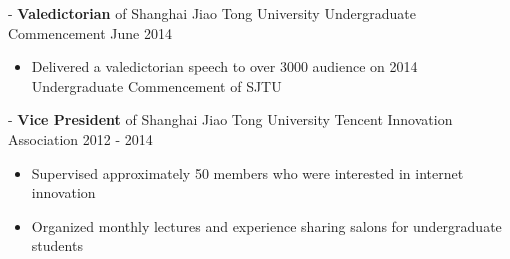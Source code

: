 \documentclass[11pt]{res}
\newcommand{\style}[1]{\color{Blue}\large\textsc{#1}}
\begin{document}
\begin{resume}
    -\sectionwidth \resumewidth 
  \textbf{Valedictorian} of Shanghai Jiao Tong University Undergraduate Commencement   \hfill{June 2014}  \hspace{-0.58in}\vspace{-0mm}
   \begin{itemize}[leftmargin=-0.1in]
  \item Delivered a valedictorian speech to over 3000 audience on 2014 Undergraduate Commencement of SJTU
  \end{itemize}\vspace{-15pt}
  
 -\sectionwidth \resumewidth  
  \textbf{Vice President} of Shanghai Jiao Tong University Tencent Innovation Association  \hfill{2012 - 2014} \hspace{-0.58in}\vspace{-0mm}
      \begin{itemize}[leftmargin=-0.1in]
          \item Supervised approximately 50 members who were interested in internet innovation
          \vspace{-5pt}
          \item Organized monthly lectures and experience sharing salons for undergraduate students
     \end{itemize}\vspace{-25pt}

\begin{comment}
\rule{18cm}{0.5mm}\\
\parshape 1 -\sectionwidth \resumewidth
\vspace{-25pt}
\section{\style{Honors And Awards}}
  \vspace{-5pt}

    \begin{tabbing}
   \hspace{5.3in}\= \hspace{2.6in}\= \kill %
  \textbf{Department Leader} of Student Science, Technology and Innovation Association  \> 2010 - 2014
    \end{tabbing}\vspace{-15pt}%


\end{comment}
\end{resume}
\end{document}
